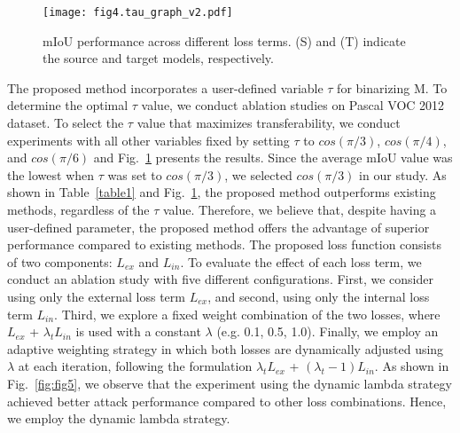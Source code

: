 \label{sec4.3:Ablation}
\begin{figure}
\centering
\texttt{[image: fig4.tau\_graph\_v2.pdf]}
\caption{mIoU performance across different loss terms. (S) and (T) indicate the source and target models, respectively.}
\label{fig:fig4}
\end{figure}
The proposed method incorporates a user-defined variable $\tau$ for binarizing M. To determine the optimal $\tau$ value, we conduct ablation studies on Pascal VOC 2012 dataset. To select the $\tau$ value that maximizes transferability, we conduct experiments with all other variables fixed by setting $\tau$ to $cos(\pi/3)$, $cos(\pi/4)$, and $cos(\pi/6)$ and Fig.~\ref{fig:fig4} presents the results. Since the average mIoU value was the lowest when $\tau$ was set to $cos(\pi/3)$, we selected $cos(\pi/3)$ in our study. As shown in Table~\ref{table1} and Fig.~\ref{fig:fig4}, the proposed method outperforms existing methods, regardless of the $\tau$ value. Therefore, we believe that, despite having a user-defined parameter, the proposed method offers the advantage of superior performance compared to existing methods. 
The proposed loss function consists of two components: $L_{ex}$ and $L_{in}$. To evaluate the effect of each loss term, we conduct an ablation study with five different configurations. First, we consider using only the external loss term $L_{ex}$, and second, using only the internal loss term $L_{in}$. Third,  we explore a fixed weight combination of the two losses, where $L_{ex}$ + $\lambda_t L_{in}$  is used with a constant $\lambda$ (e.g. 0.1, 0.5, 1.0). Finally, we employ an adaptive weighting strategy in which both losses are dynamically adjusted using $\lambda$ at each iteration, following the formulation $\lambda_tL_{ex}$ + $(\lambda_t-1) L_{in}$. As shown in Fig.~\ref{fig:fig5}, we observe that the experiment using the dynamic lambda strategy achieved better attack performance compared to other loss combinations. Hence, we employ the dynamic lambda strategy.

